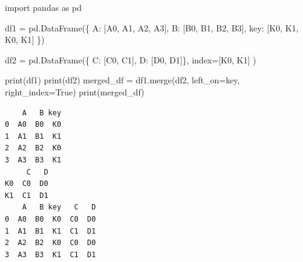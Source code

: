 \documentclass[
  polish,
  letterpaper,
  DIV=11,
  numbers=noendperiod]{scrreprt}
\newenvironment{Shaded}{\begin{snugshade}}{\end{snugshade}}
\newcommand{\BuiltInTok}[1]{\textcolor[rgb]{0.00,0.23,0.31}{#1}}
\newcommand{\ImportTok}[1]{\textcolor[rgb]{0.00,0.46,0.62}{#1}}
\newcommand{\NormalTok}[1]{\textcolor[rgb]{0.00,0.23,0.31}{#1}}
\newcommand{\OperatorTok}[1]{\textcolor[rgb]{0.37,0.37,0.37}{#1}}
\newcommand{\StringTok}[1]{\textcolor[rgb]{0.13,0.47,0.30}{#1}}
\newcommand{\VariableTok}[1]{\textcolor[rgb]{0.07,0.07,0.07}{#1}}
\begin{document}
\begin{Shaded}
\begin{Highlighting}[]
\ImportTok{import}\NormalTok{ pandas }\ImportTok{as}\NormalTok{ pd}

\NormalTok{df1 }\OperatorTok{=}\NormalTok{ pd.DataFrame(\{}
    \StringTok{\textquotesingle{}A\textquotesingle{}}\NormalTok{: [}\StringTok{\textquotesingle{}A0\textquotesingle{}}\NormalTok{, }\StringTok{\textquotesingle{}A1\textquotesingle{}}\NormalTok{, }\StringTok{\textquotesingle{}A2\textquotesingle{}}\NormalTok{, }\StringTok{\textquotesingle{}A3\textquotesingle{}}\NormalTok{],}
    \StringTok{\textquotesingle{}B\textquotesingle{}}\NormalTok{: [}\StringTok{\textquotesingle{}B0\textquotesingle{}}\NormalTok{, }\StringTok{\textquotesingle{}B1\textquotesingle{}}\NormalTok{, }\StringTok{\textquotesingle{}B2\textquotesingle{}}\NormalTok{, }\StringTok{\textquotesingle{}B3\textquotesingle{}}\NormalTok{],}
    \StringTok{\textquotesingle{}key\textquotesingle{}}\NormalTok{: [}\StringTok{\textquotesingle{}K0\textquotesingle{}}\NormalTok{, }\StringTok{\textquotesingle{}K1\textquotesingle{}}\NormalTok{, }\StringTok{\textquotesingle{}K0\textquotesingle{}}\NormalTok{, }\StringTok{\textquotesingle{}K1\textquotesingle{}}\NormalTok{]}
\NormalTok{\})}

\NormalTok{df2 }\OperatorTok{=}\NormalTok{ pd.DataFrame(\{}
    \StringTok{\textquotesingle{}C\textquotesingle{}}\NormalTok{: [}\StringTok{\textquotesingle{}C0\textquotesingle{}}\NormalTok{, }\StringTok{\textquotesingle{}C1\textquotesingle{}}\NormalTok{],}
    \StringTok{\textquotesingle{}D\textquotesingle{}}\NormalTok{: [}\StringTok{\textquotesingle{}D0\textquotesingle{}}\NormalTok{, }\StringTok{\textquotesingle{}D1\textquotesingle{}}\NormalTok{]\},}
\NormalTok{    index}\OperatorTok{=}\NormalTok{[}\StringTok{\textquotesingle{}K0\textquotesingle{}}\NormalTok{, }\StringTok{\textquotesingle{}K1\textquotesingle{}}\NormalTok{]}
\NormalTok{)}

\BuiltInTok{print}\NormalTok{(df1)}
\BuiltInTok{print}\NormalTok{(df2)}
\NormalTok{merged\_df }\OperatorTok{=}\NormalTok{ df1.merge(df2, left\_on}\OperatorTok{=}\StringTok{\textquotesingle{}key\textquotesingle{}}\NormalTok{, right\_index}\OperatorTok{=}\VariableTok{True}\NormalTok{)}
\BuiltInTok{print}\NormalTok{(merged\_df)}
\end{Highlighting}
\end{Shaded}

\begin{verbatim}
    A   B key
0  A0  B0  K0
1  A1  B1  K1
2  A2  B2  K0
3  A3  B3  K1
     C   D
K0  C0  D0
K1  C1  D1
    A   B key   C   D
0  A0  B0  K0  C0  D0
1  A1  B1  K1  C1  D1
2  A2  B2  K0  C0  D0
3  A3  B3  K1  C1  D1
\end{verbatim}
\end{document}
